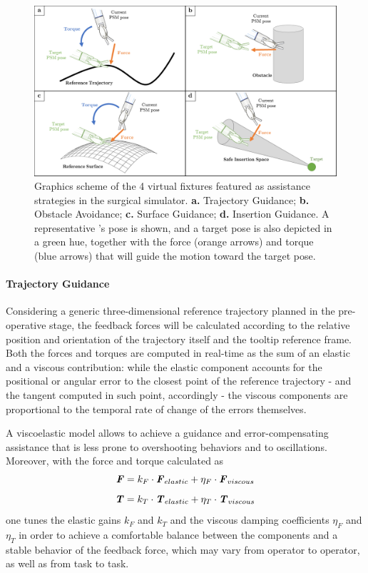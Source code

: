 \documentclass[../main.tex]{subfiles}
\begin{document}
\begin{figure}
    \centering
    \includegraphics[width=\textwidth]{images/vfs_graphics.png}
    \caption{Graphics scheme of the 4 virtual fixtures featured as assistance strategies in the surgical simulator. \textbf{a.} Trajectory Guidance; \textbf{b.} Obstacle Avoidance; \textbf{c.} Surface Guidance; \textbf{d.} Insertion Guidance. A representative \psm's pose is shown, and a target pose is also depicted in a green hue, together with the force (orange arrows) and torque (blue arrows) that will guide the motion toward the target pose.}
    \label{fig:vfsgraphics}
\end{figure}

\paragraph{Trajectory Guidance} 
Considering a generic three-dimensional reference trajectory planned in the pre-operative stage, the feedback forces will be calculated according to the relative position and orientation of the trajectory itself and the tooltip reference frame. Both the forces and torques are computed in real-time as the sum of an elastic and a viscous contribution: while the elastic component accounts for the positional or angular error to the closest point of the reference trajectory - and the tangent computed in such point, accordingly - the viscous components are proportional to the temporal rate of change of the errors themselves. 

A viscoelastic model allows to achieve a guidance and error-compensating assistance that is less prone to overshooting behaviors and to oscillations. Moreover, with the force and torque calculated as 
\begin{equation}
    \textbf{\textit{F}} = k_F\cdot\textbf{\textit{F}}_{elastic} + \eta_F\cdot\textbf{\textit{F}}_{viscous} 
    \label{eq:force}
\end{equation}
\begin{equation}
    \textbf{\textit{T}} = k_T\cdot\textbf{\textit{T}}_{elastic} + \eta_T\cdot\textbf{\textit{T}}_{viscous}
    \label{eq:torque}
\end{equation}
one tunes the elastic gains $k_F$ and $k_T$ and the viscous damping coefficients $\eta_F$ and $\eta_T$ in order to achieve a comfortable balance between the components and a stable behavior of the feedback force, which may vary from operator to operator, as well as from task to task.
\end{document}
